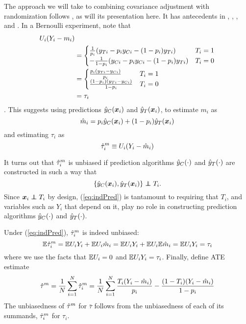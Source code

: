 The approach we will take to combining covariance adjustment with
randomization follows \citet{loop}, as will its presentation here.
It has antecedents in \citet{rosenbaum2002covariance},
\citet{aronowMiddleton}, \citet{wager2016high}, and \citet{tame}.
In a Bernoulli experiment, note that
\begin{align*}
U_i(Y_i-m_i)&\\
&=\begin{cases}
\frac{1}{p_i}(y_{Ti}-p_iy_{Ci}-(1-p_i)y_{Ti})&T_i=1\\
-\frac{1}{1-p_i}(y_{Ci}-p_iy_{Ci}-(1-p_i)y_{Ti})&T_i=0 \end{cases}\\
&=\begin{cases}
\frac{p_i(y_{Ti}-y_{Ci})}{p_i}&T_i=1\\
\frac{(1-p_i)(y_{Ti}-y_{Ci})}{1-p_i}&T_i=0
\end{cases}\\
&=\tau_i
\end{align*}.
This suggests using predictions $\hat{y}_C(\bm{x}_i)$ and $\hat{y}_T(\bm{x}_i)$, to estimate $m_i$ as
\begin{equation}\label{eq:hatm}
\hat{m}_i=p_i\hat{y}_C(\bm{x}_i)+(1-p_i)\hat{y}_T(\bm{x}_i) 
\end{equation}
and estimating $\tau_i$ as
\begin{equation*}
\hat{\tau}_i^m\equiv U_i(Y_i-\hat{m}_i)
\end{equation*}

It turns out that $\hat{\tau}_i^m$ is unbiased if prediction algorithms $\hat{y}_C(\cdot)$ and $\hat{y}_T(\cdot)$
are constructed in such a way that
\begin{equation}\label{eq:indPred}
\{\predcx,\predtx\}\independent T_i.
\end{equation}
Since $\bm{x}_i\independent T_i$ by design, (\ref{eq:indPred}) is
tantamount to requiring that $T_i$, and variables such as $Y_i$ that
depend on it, play no role in constructing prediction algorithms $\hat{y}_C(\cdot)$ and
$\hat{y}_T(\cdot)$.

Under (\ref{eq:indPred}), $\hat{\tau}_i^m$ is indeed unbiased:
\begin{equation}
\mathbb{E} \hat{\tau}_i^m=\mathbb{E} U_iY_i+\mathbb{E} U_i\hat{m}_i=\mathbb{E} U_iY_i+\mathbb{E} U_i\mathbb{E}\hat{m}_i=\mathbb{E}
U_iY_i=\tau_i
\end{equation}
where we use the facts that $\mathbb{E} U_i=0$ and $\mathbb{E} U_iY_i=\tau_i$.
Finally, define ATE estimate
\begin{equation} \label{eq:thm}
\hat{\tau}^m=\frac{1}{N}\displaystyle\sum_{i=1}^N
\hat{\tau}_i^m=\frac{1}{N}\displaystyle\sum_{i=1}^N
\frac{T_i(Y_i-\hat{m}_i)}{p_i}-\frac{(1-T_i)(Y_i-\hat{m}_i)}{1-p_i}
\end{equation}
The unbiasedness of $\hat{\tau}^m$ for $\bar{\tau}$ follows from the
unbiasedness of each of its summands, $\hat{\tau}_i^m$ for $\tau_i$.

